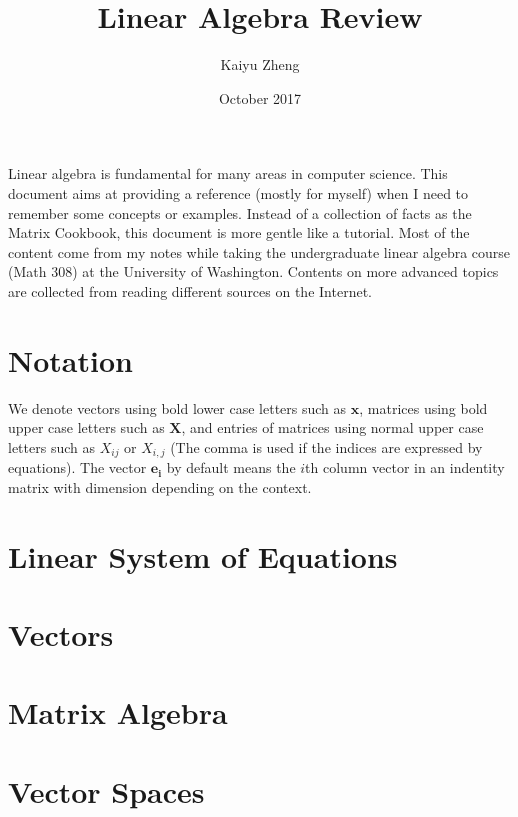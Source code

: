 \documentclass[11pt]{article}
\title{Linear Algebra Review}
\author{Kaiyu Zheng}
\date{October 2017}
\theoremstyle{definition}
\begin{document}
\maketitle

\noindent Linear algebra is fundamental for many areas in computer science. This document aims at providing a reference (mostly for myself) when I need to remember some concepts or examples. Instead of a collection of facts as the Matrix Cookbook, this document is more gentle like a tutorial. Most of the content come from my notes while taking the undergraduate linear algebra course (Math 308) at the University of Washington. Contents on more advanced topics are collected from reading different sources on the Internet.

\footnotesize
\begin{multicols}{3}
\setlength{\columnseprule}{0.4pt}
  \tableofcontents
\end{multicols}
\normalsize

\newpage
\section*{Notation}
We denote vectors using bold lower case letters such as $\bm{x}$, matrices using bold upper case letters such as $\bm{X}$, and entries of matrices using normal upper case letters such as $X_{ij}$ or $X_{i,j}$ (The comma is used if the indices are expressed by equations).  The vector $\bm{e_i}$ by default means the $i$th column vector in an indentity matrix with dimension depending on the context.

\section{Linear System of Equations}
\label{sec:linsys}


\section{Vectors}
\label{sec:vectors}


\section{Matrix Algebra}
\label{sec:malg}


\section{Vector Spaces}
\label{sec:vecspace}

\end{document}
